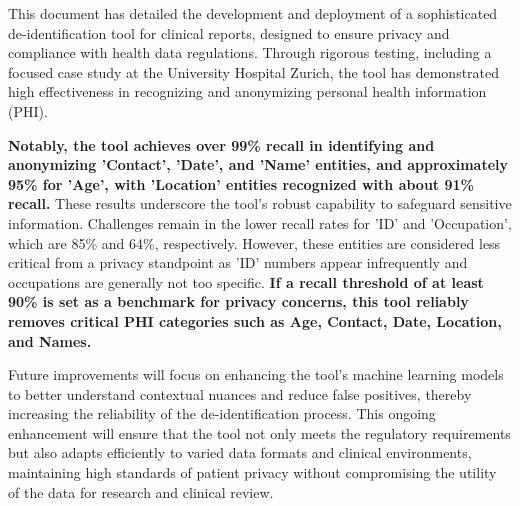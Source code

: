 This document has detailed the development and deployment of a
sophisticated de-identification tool for clinical reports, designed to
ensure privacy and compliance with health data regulations. Through
rigorous testing, including a focused case study at the University
Hospital Zurich, the tool has demonstrated high effectiveness in
recognizing and anonymizing personal health information
(PHI).

{\bf Notably, the tool achieves over 99\% recall in identifying and
  anonymizing 'Contact', 'Date', and 'Name' entities, and
  approximately 95\% for 'Age', with 'Location' entities recognized
  with about 91\% recall.} These results underscore the tool's robust
capability to safeguard sensitive information.  Challenges remain in
the lower recall rates for 'ID' and 'Occupation', which are 85\% and
64\%, respectively. However, these entities are considered less
critical from a privacy standpoint as 'ID' numbers appear infrequently
and occupations are generally not too specific. {\bf If a recall
  threshold of at least 90\% is set as a benchmark for privacy
  concerns, this tool reliably removes critical PHI categories such as
  Age, Contact, Date, Location, and Names.}

Future improvements will focus on enhancing the tool's machine
learning models to better understand contextual nuances and reduce
false positives, thereby increasing the reliability of the
de-identification process. This ongoing enhancement will ensure that
the tool not only meets the regulatory requirements but also adapts
efficiently to varied data formats and clinical environments,
maintaining high standards of patient privacy without compromising the
utility of the data for research and clinical review.

